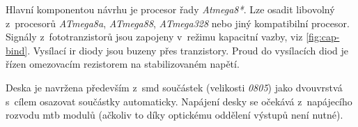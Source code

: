 Hlavní komponentou návrhu je procesor řady \textit{Atmega8*}. Lze osadit
libovolný z~procesorů \textit{ATmega8a}, \textit{ATmega88}, \textit{ATmega328}
nebo jiný kompatibilní procesor. Signály z~fototranzistorů jsou zapojeny
v~režimu kapacitní vazby, viz \ref{fig:cap-bind}. Vysílací \gls{ir} diody jsou
buzeny přes tranzistory.  Proud do vysílacích diod je řízen omezovacím
rezistorem na stabilizovaném napětí.

Deska je navržena především z~\gls{smd} součástek (velikosti \textit{0805})
jako dvouvrstvá s~cílem osazovat součástky automaticky. Napájení desky se
očekává z~napájecího rozvodu \gls{mtb} modulů (ačkoliv to díky optickému
oddělení výstupů není nutné).

